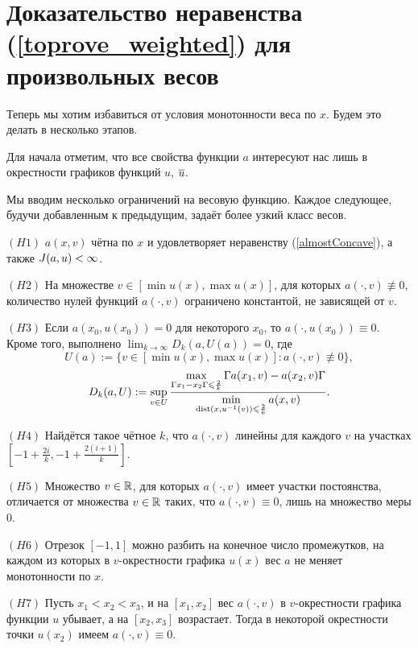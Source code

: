 \section{Доказательство неравенства (\ref{toprove_weighted}) для произвольных весов}
\label{moveForth}

Теперь мы хотим избавиться от условия монотонности веса по $x$.
Будем это делать в несколько этапов.

Для начала отметим, что все свойства функции $a$ интересуют нас лишь в окрестности графиков функций $u$, $\mon{u}$.

Мы вводим несколько ограничений на весовую функцию.
Каждое следующее, будучи добавленным к предыдущим, задаёт более узкий класс весов. 

\bigskip

\smallskip
\noindent
$(H1)$ $a(x, v)$ чётна по $x$ и удовлетворяет неравенству (\ref{almostConcave}), а также $J(a, u) < \infty$.
\smallskip

\bigskip
\noindent
$(H2)$ На множестве $v \in [\min u(x), \max u(x)]$, для которых $a(\cdot, v) \not\equiv 0$,
количество нулей функций $a(\cdot, v)$ ограничено константой, не зависящей от $v$.

\bigskip
\noindent
$(H3)$ Если $a(x_0, u(x_0)) = 0$ для некоторого $x_0$, то $a(\cdot, u(x_0)) \equiv 0$.
Кроме того, выполнено $\lim_{k \to \infty} D_k(a, U(a)) = 0$, где
$$U(a) := \{ v \in [\min u(x), \max u(x)]: a(\cdot, v) \not \equiv 0 \},$$
\begin{equation}
\label{bigD}
D_k(a, U) := \sup \limits_{v \in U}
\frac{\max \limits_{\abs{x_1 - x_2} \le \frac{2}{k}} \abs{a(x_1, v) - a(x_2, v)}}
{\min \limits_{\dist (x, u^{-1} (v)) \le \frac{2}{k}} a(x, v)}.
\end{equation}

\bigskip
\noindent
$(H4)$ Найдётся такое чётное $k$, что $a(\cdot, v)$ линейны для каждого $v$ на участках
$[-1 + \frac{2i}{k}, -1 + \frac{2(i + 1)}{k}]$.

\bigskip
\noindent
$(H5)$ Множество $v \in \mathbb R$, для которых $a(\cdot, v)$ имеет участки постоянства,
отличается от множества $v \in \mathbb R$ таких, что $a(\cdot, v) \equiv 0$,
лишь на множество меры $0$.

\bigskip
\noindent
$(H6)$ Отрезок $[-1, 1]$ можно разбить на конечное число промежутков,
на каждом из которых в $v$-окрестности графика $u(x)$ вес $a$ не меняет монотонности по $x$.

\bigskip
\noindent
$(H7)$ Пусть $x_1 < x_2 < x_3$,
и на $[x_1, x_2]$ вес $a(\cdot, v)$ в $v$-окрестности графика функции $u$ убывает,
а на $[x_2, x_3]$ возрастает.
Тогда в некоторой окрестности точки $u(x_2)$ имеем $a(\cdot, v) \equiv 0$.

